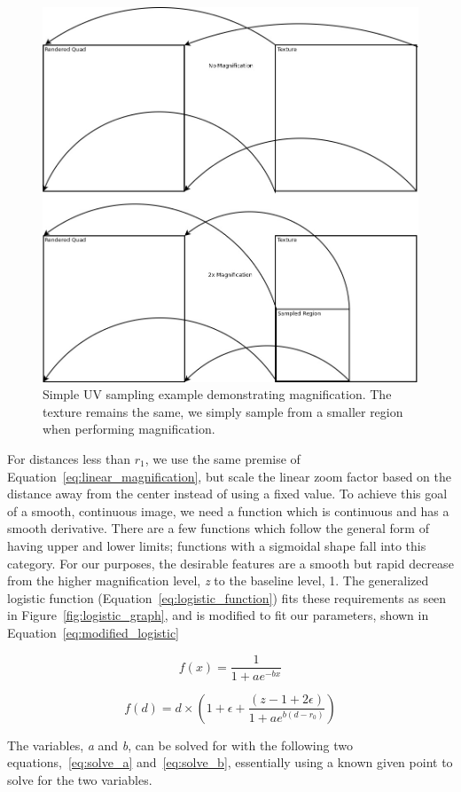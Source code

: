 \begin{figure}[htp] \centering
    \includegraphics[width=0.6\linewidth]{img/texture_mag.jpg}
    \caption[UV Sampling]{Simple UV sampling example demonstrating magnification. The texture remains the same, we simply sample from a smaller region when performing magnification.}
    \label{fig:UV_sampling}
\end{figure}

For distances less than \emph{$r_1$}, we use the same premise of Equation~\ref{eq:linear_magnification}, but 
scale the linear zoom factor based on the distance away from the center instead of using a fixed value. To 
achieve this goal of a smooth, continuous image, we need a function which is continuous and has a smooth derivative. There are a few functions which follow the general form of having upper and lower limits; functions with a sigmoidal shape fall into this category. For our purposes, the desirable features are a smooth but rapid decrease from the higher magnification level, \emph{z} to the baseline level, 1. 
The generalized logistic function (Equation~\ref{eq:logistic_function}) fits these requirements as seen in 
Figure~\ref{fig:logistic_graph}, and is modified to fit our parameters, shown in 
Equation~\ref{eq:modified_logistic}

\begin{equation}
    \label{eq:logistic_function}
    f(x) = \frac{1}{1 + ae^{-bx}}
\end{equation}

\begin{equation}
    \label{eq:modified_logistic}
    f(d) = d \times \left( 1 + \epsilon + \frac{(z - 1 + 2\epsilon)}{1 + ae^{b(d-r_0)}}\right)
\end{equation}

The variables, \emph{a} and \emph{b}, can be solved for with the following two equations,~\ref{eq:solve_a} and~\ref{eq:solve_b}, essentially using a known given point to solve for the two variables.

